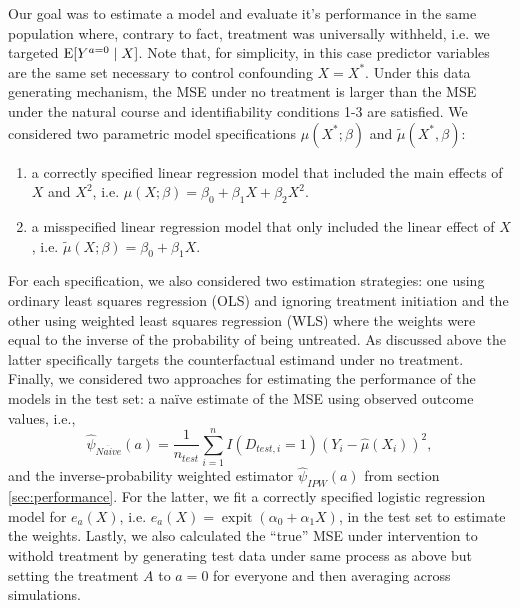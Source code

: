 Our goal was to estimate a model and evaluate it's performance in the same population where, contrary to fact, treatment was universally withheld, i.e. we targeted $\operatorname{E}[Y^{a=0} \mid X]$. Note that, for simplicity, in this case predictor variables are the same set necessary to control confounding $X = X^*$. Under this data generating mechanism, the MSE under no treatment is larger than the MSE under the natural course and identifiability conditions 1-3 are satisfied. We considered two parametric model specifications $\mu(X^*; \beta)$ and $\widetilde{\mu}(X^*, \beta)$:
\begin{enumerate}
    \item a correctly specified linear regression model that included the main effects of $X$ and $X^2$, i.e. $\mu(X; \beta) = \beta_0 + \beta_1 X + \beta_2 X^2$.
    \item a misspecified linear regression model that only included the linear effect of $X$, i.e. $\widetilde{\mu}(X; \beta) = \beta_0 + \beta_1 X$.
\end{enumerate} 
For each specification, we also considered two estimation strategies: one using ordinary least squares regression (OLS) and ignoring treatment initiation and the other using weighted least squares regression (WLS) where the weights were equal to the inverse of the probability of being untreated. As discussed above the latter specifically targets the counterfactual estimand under no treatment. Finally, we considered two approaches for estimating the performance of the models in the test set: a na\"{i}ve estimate of the MSE using observed outcome values, i.e., 
$$\widehat{\psi}_{Na\ddot{i}ve}(a) = \frac{1}{n_{test}} \sum_{i=1}^n I(D_{test,i} = 1) (Y_i - \widehat{\mu}(X_i))^2,$$ 
and the inverse-probability weighted estimator $\widehat{\psi}_{IPW}(a)$ from section \ref{sec:performance}. For the latter, we fit a correctly specified logistic regression model for $e_a(X)$, i.e. $e_a(X) = \operatorname{expit}(\alpha_0 + \alpha_1 X)$, in the test set to estimate the weights. Lastly, we also calculated the ``true'' MSE under intervention to withold treatment by generating test data under same process as above but setting the treatment $A$ to $a = 0$ for everyone and then averaging across simulations.


